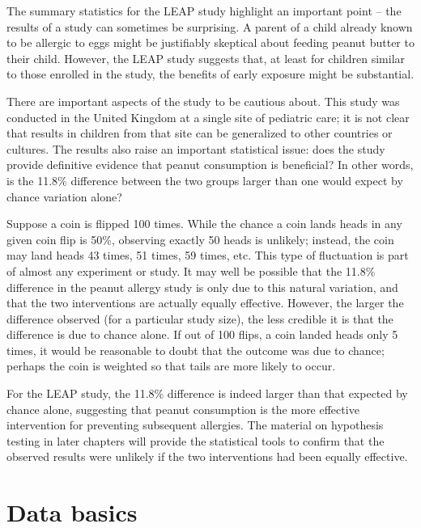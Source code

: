 	
The summary statistics for the LEAP study highlight an important point -- the results of a study can sometimes be surprising.  A parent of a child already known to be allergic to eggs might be justifiably skeptical about feeding peanut butter to their child. However, the LEAP study suggests that, at least for children similar to those enrolled in the study, the benefits of early exposure might be substantial. 

There are important aspects of the study to be cautious about.  This study was conducted in the United Kingdom at a single site of pediatric care; it is not clear that results in children from that site can be generalized to other countries or cultures. The results also raise an important statistical issue: does the study provide definitive evidence that peanut consumption is beneficial? In other words, is the 11.8\% difference between the two groups larger than one would expect by chance variation alone? 

Suppose a coin is flipped 100 times. While the chance a coin lands heads in any given coin flip is 50\%, observing exactly 50 heads is unlikely; instead, the coin may land heads 43 times, 51 times, 59 times, etc. This type of fluctuation is part of almost any experiment or study. It may well be possible that the 11.8\% difference in the peanut allergy study is only due to this natural variation, and that the two interventions are actually equally effective. However, the larger the difference observed (for a particular study size), the less credible it is that the difference is due to chance alone. If out of 100 flips, a coin landed heads only 5 times, it would be reasonable to doubt that the outcome was due to chance; perhaps the coin is weighted so that tails are more likely to occur.

For the LEAP study, the 11.8\% difference is indeed larger than that expected by chance alone, suggesting that peanut consumption is the more effective intervention for preventing subsequent allergies. The material on hypothesis testing in later chapters will provide the statistical tools to confirm that the observed results were unlikely if the two interventions had been equally effective.



\section{Data basics}
\label{dataBasics}

